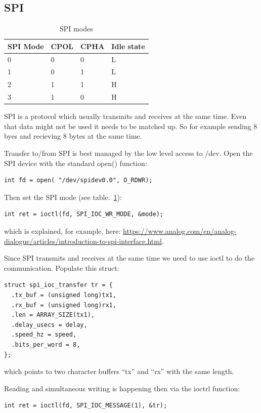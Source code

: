 \documentclass[12pt]{report}
\begin{document}
\subsection{SPI}
\begin{table}[!ht]
  \begin{center}
  \caption{SPI modes\label{spimodes}}
  \begin{tabular}{l|l|l|l}
    SPI Mode & 	CPOL & 	CPHA & Idle state \\
    \hline
    0& 	0&	0& 	L \\
    1& 	0&	1& 	L \\
    2& 	1&	1& 	H \\
    3& 	1&	0& 	H \\
  \end{tabular}
  \end{center}
\end{table}
SPI is a protocol which usually transmits and receives at the same
time. Even that data might not be used it needs to be matched up. So
for example sending 8 byes and recieving 8 bytes at the same time.

Transfer to/from SPI is best managed by the low level access to /dev.
Open the SPI device with the standard open() function:
\begin{verbatim}
int fd = open( "/dev/spidev0.0", O_RDWR);
\end{verbatim}

Then set the SPI mode (see table.~\ref{spimodes}):
\begin{verbatim}
int ret = ioctl(fd, SPI_IOC_WR_MODE, &mode);
\end{verbatim}
which is explained, for example, here:
\url{https://www.analog.com/en/analog-dialogue/articles/introduction-to-spi-interface.html}.

Since SPI transmits and receives at the same time we need to
use ioctl to do the communication.
Populate this struct:
\begin{verbatim}
struct spi_ioc_transfer tr = {
  .tx_buf = (unsigned long)tx1,
  .rx_buf = (unsigned long)rx1,
  .len = ARRAY_SIZE(tx1),
  .delay_usecs = delay,
  .speed_hz = speed,
  .bits_per_word = 8,
};
\end{verbatim}
which points to two character buffers ``tx'' and ``rx'' with the
same length.

Reading and simultaneous writing is happening then via the ioctrl
function:
\begin{verbatim}
int ret = ioctl(fd, SPI_IOC_MESSAGE(1), &tr);
\end{verbatim}
\end{document}
